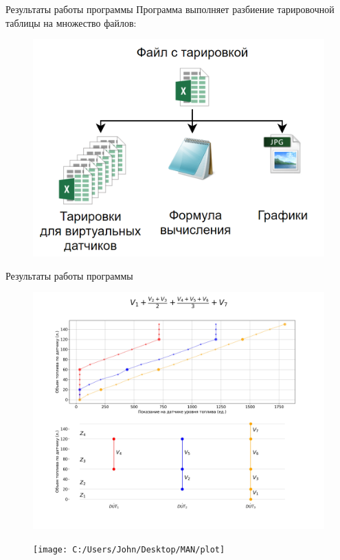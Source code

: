\documentclass[usenames,dvipsnames,11pt]{beamer}
\begin{document}
\begin{frame}{Результаты работы программы}
	Программа выполняет разбиение тарировочной таблицы на множество файлов:
	\begin{figure}
		\centering
		\includegraphics[width=0.7\linewidth]{graphics/screenshot010}
	\end{figure}
\end{frame}

\begin{frame}{Результаты работы программы}
	\begin{figure}
	\centering
	\includegraphics[width=0.95\linewidth]{../Программа/test/test_main/tmp2/plot}
	\end{figure}
\end{frame}

\begin{frame}
	\begin{figure}
	\centering
	\texttt{[image: C:/Users/John/Desktop/MAN/plot]}
	\end{figure}
	
\end{frame}
\end{document}
